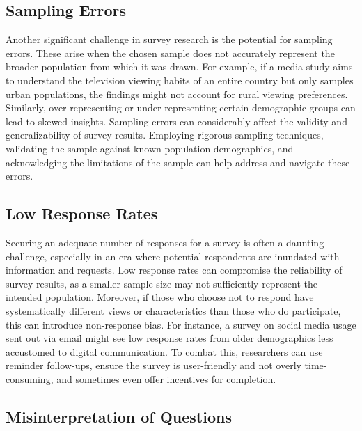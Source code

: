 \documentclass[
  b5paper]{book}
\begin{document}
\hypertarget{sampling-errors}{%
\subsection*{Sampling Errors}\label{sampling-errors}}

Another significant challenge in survey research is the potential for sampling errors. These arise when the chosen sample does not accurately represent the broader population from which it was drawn. For example, if a media study aims to understand the television viewing habits of an entire country but only samples urban populations, the findings might not account for rural viewing preferences. Similarly, over-representing or under-representing certain demographic groups can lead to skewed insights. Sampling errors can considerably affect the validity and generalizability of survey results. Employing rigorous sampling techniques, validating the sample against known population demographics, and acknowledging the limitations of the sample can help address and navigate these errors.

\hypertarget{low-response-rates}{%
\subsection*{Low Response Rates}\label{low-response-rates}}

Securing an adequate number of responses for a survey is often a daunting challenge, especially in an era where potential respondents are inundated with information and requests. Low response rates can compromise the reliability of survey results, as a smaller sample size may not sufficiently represent the intended population. Moreover, if those who choose not to respond have systematically different views or characteristics than those who do participate, this can introduce non-response bias. For instance, a survey on social media usage sent out via email might see low response rates from older demographics less accustomed to digital communication. To combat this, researchers can use reminder follow-ups, ensure the survey is user-friendly and not overly time-consuming, and sometimes even offer incentives for completion.

\hypertarget{misinterpretation-of-questions}{%
\subsection*{Misinterpretation of Questions}\label{misinterpretation-of-questions}}
\end{document}
